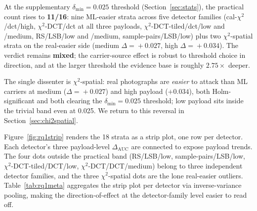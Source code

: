 \documentclass[10pt,twocolumn,a4paper]{article}
\begin{document}
At the supplementary $\delta_\text{min}\!=\!0.025$ threshold (Section~\ref{sec:stats}), the practical count rises to \textbf{11/16}: nine ML-easier strata across five detector families (cal-$\chi^2$/dct/high, $\chi^2$-DCT/dct at all three payloads, $\chi^2$-DCT-tiled/dct/low and /medium, RS/LSB/low and /medium, sample-pairs/LSB/low) plus two $\chi^2$-spatial strata on the real-easier side (medium $\Delta\!=\!+0.027$, high $\Delta\!=\!+0.034$). The verdict remains \textbf{mixed}; the carrier-source effect is robust to threshold choice in direction, and at the larger threshold the evidence base is roughly $2.75\!\times\!$ deeper.

The single dissenter is $\chi^2$-spatial: real photographs are \emph{easier} to attack than ML carriers at medium ($\Delta\!=\!+0.027$) and high payload ($+0.034$), both Holm-significant and both clearing the $\delta_\text{min}\!=\!0.025$ threshold; low payload sits inside the trivial band even at 0.025. We return to this reversal in Section~\ref{sec:chi2spatial}.

Figure~\ref{fig:rq1strip} renders the 18 strata as a strip plot, one row per detector. Each detector's three payload-level $\Delta_\text{AUC}$ are connected to expose payload trends. The four dots outside the practical band (RS/LSB/low, sample-pairs/LSB/low, $\chi^2$-DCT-tiled/DCT/low, $\chi^2$-DCT/DCT/medium) belong to three independent detector families, and the three $\chi^2$-spatial dots are the lone real-easier outliers. Table~\ref{tab:rq1meta} aggregates the strip plot per detector via inverse-variance pooling, making the direction-of-effect at the detector-family level easier to read off.
\end{document}

